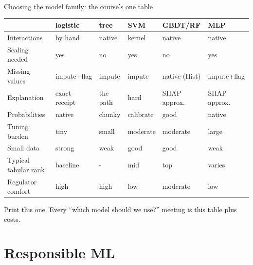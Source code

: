 \documentclass[10pt,aspectratio=169]{beamer}
\begin{document}
\begin{frame}{Choosing the model family: the course's one table}
  \footnotesize
  \begin{center}
  \begin{tabular}{@{}llllll@{}}
    \toprule
     & logistic & tree & SVM & GBDT/RF & MLP \\
    \midrule
    Interactions & by hand & native & kernel & native & native \\
    Scaling needed & yes & no & yes & no & yes \\
    Missing values & impute+flag & impute & impute & native (Hist) & impute+flag \\
    Explanation & exact receipt & the path & hard & SHAP approx. & SHAP approx. \\
    Probabilities & native & chunky & calibrate & good & native \\
    Tuning burden & tiny & small & moderate & moderate & \alert{large} \\
    Small data & \alert{strong} & weak & good & good & weak \\
    Typical tabular rank & baseline & - & mid & \alert{top} & varies \\
    Regulator comfort & \alert{high} & high & low & moderate & low \\
    \bottomrule
  \end{tabular}
  \end{center}
  \vspace{0.4em}
  \begin{center}\small
    Print this one. Every ``which model should we use?'' meeting is this
    table plus costs.
  \end{center}
\end{frame}

\section{Responsible ML}
\end{document}
